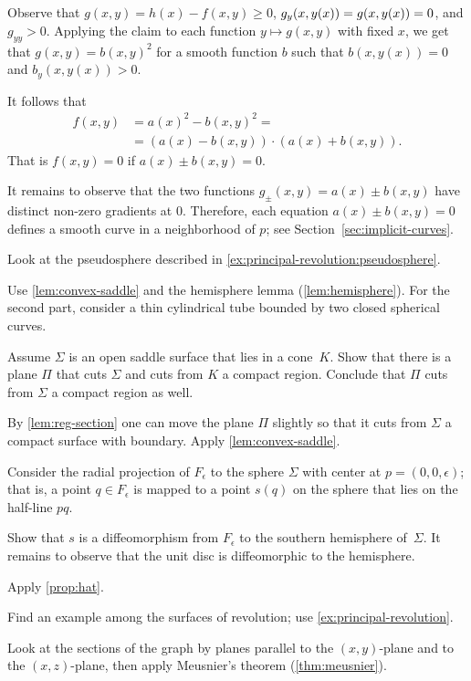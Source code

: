 \begin{multicols}{2}
Observe that $g(x,y)=h(x)-f(x,y)\ge 0$, $g_y(x,y(x))\z=g(x,y(x))\z=0$, and $g_{yy}>0$.
Applying the claim to each function $y\mapsto g(x,y)$ with fixed $x$, we get that $g(x,y)=b(x,y)^2$ for a smooth function $b$ such that 
$b(x,y(x))=0$ and $b_y(x,y(x))>0$.

It follows that 
\begin{align*}
f(x,y)&=a(x)^2-b(x,y)^2=
\\
&=
(a(x)-b(x,y))\cdot (a(x)+b(x,y)).
\end{align*}
That is $f(x,y)=0$ if $a(x)\pm b(x,y) =0$.

It remains to observe that the two functions $g_\pm(x,y)=a(x)\pm b(x,y)$ have distinct non-zero gradients at $0$.
Therefore, each equation $a(x)\pm b(x,y) =0$ defines a smooth curve in a neighborhood of $p$;
see Section~\ref{sec:implicit-curves}.

 Look at the pseudosphere described in \ref{ex:principal-revolution:pseudosphere}.

Use \ref{lem:convex-saddle} and the hemisphere lemma (\ref{lem:hemisphere}).
For the second part, consider a thin cylindrical tube bounded by two closed spherical curves.

Assume $\Sigma$ is an open saddle surface that lies in a cone~$K$.
Show that there is a plane $\Pi$ that cuts $\Sigma$ and cuts from $K$ a compact region.
Conclude that $\Pi$ cuts from $\Sigma$ a compact region as well. 

By \ref{lem:reg-section} one can move the plane $\Pi$ slightly so that it cuts from $\Sigma$ a compact surface with boundary.
Apply \ref{lem:convex-saddle}.


Consider the radial projection of $F_\epsilon$ to the sphere $\Sigma$ with center at $p=(0,0,\epsilon)$;
that is, a point $q\in F_\epsilon$ is mapped to a point $s(q)$ on the sphere that lies on the half-line $pq$.

Show that $s$ is a diffeomorphism from $F_\epsilon$ to the southern hemisphere of~$\Sigma$.
It remains to observe that the unit disc is diffeomorphic to the hemisphere.

 Apply \ref{prop:hat}.

Find an example among the surfaces of revolution;
use \ref{ex:principal-revolution}.

 Look at the sections of the graph by planes parallel to the $(x,y)$-plane and to the $(x,z)$-plane, then apply Meusnier’s theorem (\ref{thm:meusnier}).


\end{multicols}
